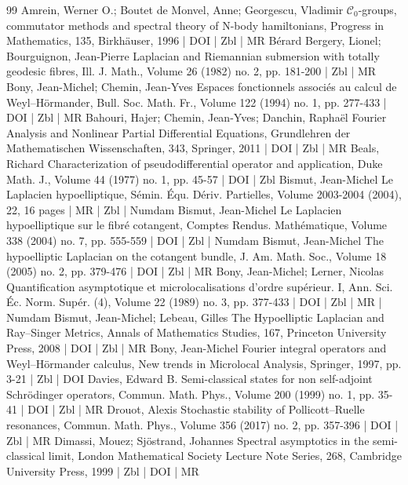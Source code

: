 \documentclass[10pt]{amsart}
\theoremstyle{definition}\newtheorem{defi}[theo]{Definition}\newtheorem{rema}[theo]{Remark}\newtheorem{exam}[theo]{Example}\newtheorem{exem}[theo]{Example}\newtheorem{nota}[theo]{Notation}
\begin{document}
\begin{thebibliography}{99}
 Amrein, Werner O.; Boutet de Monvel, Anne; Georgescu, Vladimir $\mathcal{C}_{0}$-groups, commutator methods and spectral theory of N-body hamiltonians, Progress in Mathematics, 135, Birkhäuser, 1996 | DOI | Zbl | MR
 Bérard Bergery, Lionel; Bourguignon, Jean-Pierre Laplacian and Riemannian submersion with totally geodesic fibres, Ill. J. Math., Volume 26 (1982) no. 2, pp. 181-200 | Zbl | MR
 Bony, Jean-Michel; Chemin, Jean-Yves Espaces fonctionnels associés au calcul de Weyl–Hörmander, Bull. Soc. Math. Fr., Volume 122 (1994) no. 1, pp. 277-433 | DOI | Zbl | MR
 Bahouri, Hajer; Chemin, Jean-Yves; Danchin, Raphaël Fourier Analysis and Nonlinear Partial Differential Equations, Grundlehren der Mathematischen Wissenschaften, 343, Springer, 2011 | DOI | Zbl | MR
 Beals, Richard Characterization of pseudodifferential operator and application, Duke Math. J., Volume 44 (1977) no. 1, pp. 45-57 | DOI | Zbl
 Bismut, Jean-Michel Le Laplacien hypoelliptique, Sémin. Équ. Dériv. Partielles, Volume 2003-2004 (2004), 22, 16 pages | MR | Zbl | Numdam
 Bismut, Jean-Michel Le Laplacien hypoelliptique sur le fibré cotangent, Comptes Rendus. Mathématique, Volume 338 (2004) no. 7, pp. 555-559 | DOI | Zbl | Numdam
 Bismut, Jean-Michel The hypoelliptic Laplacian on the cotangent bundle, J. Am. Math. Soc., Volume 18 (2005) no. 2, pp. 379-476 | DOI | Zbl | MR
 Bony, Jean-Michel; Lerner, Nicolas Quantification asymptotique et microlocalisations d’ordre supérieur. I, Ann. Sci. Éc. Norm. Supér. (4), Volume 22 (1989) no. 3, pp. 377-433 | DOI | Zbl | MR | Numdam
 Bismut, Jean-Michel; Lebeau, Gilles The Hypoelliptic Laplacian and Ray–Singer Metrics, Annals of Mathematics Studies, 167, Princeton University Press, 2008 | DOI | Zbl | MR
 Bony, Jean-Michel Fourier integral operators and Weyl–Hörmander calculus, New trends in Microlocal Analysis, Springer, 1997, pp. 3-21 | Zbl | DOI
 Davies, Edward B. Semi-classical states for non self-adjoint Schrödinger operators, Commun. Math. Phys., Volume 200 (1999) no. 1, pp. 35-41 | DOI | Zbl | MR
 Drouot, Alexis Stochastic stability of Pollicott–Ruelle resonances, Commun. Math. Phys., Volume 356 (2017) no. 2, pp. 357-396 | DOI | Zbl | MR
 Dimassi, Mouez; Sjöstrand, Johannes Spectral asymptotics in the semi-classical limit, London Mathematical Society Lecture Note Series, 268, Cambridge University Press, 1999 | Zbl | DOI | MR

\end{thebibliography}
\end{document}

